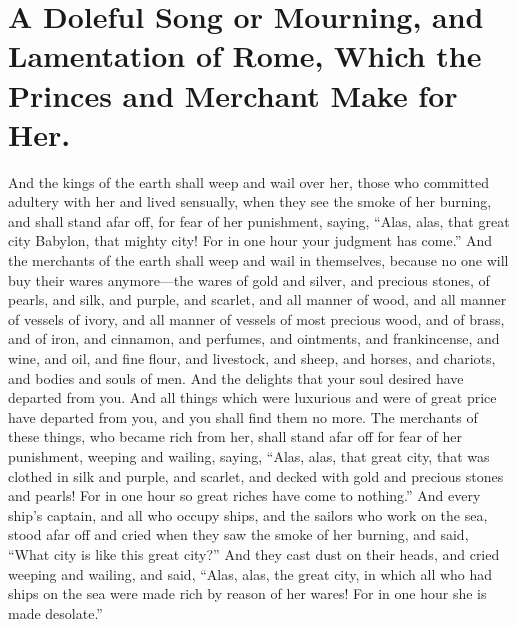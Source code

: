 \chapter[Sermon 79. A Doleful Song or Mourning, and Lamentation of Rome, Which the Princes and Merchant Make for Her.]{A Doleful Song or Mourning, and Lamentation of Rome, Which the Princes and Merchant Make for Her.}
\label{sermon:079}

And the kings of the earth shall weep and wail over her, those who committed adultery with her and lived sensually, when they see the smoke of her burning, and shall stand afar off, for fear of her punishment, saying, “Alas, alas, that great city Babylon, that mighty city! For in one hour your judgment has come.” And the merchants of the earth shall weep and wail in themselves, because no one will buy their wares anymore—the wares of gold and silver, and precious stones, of pearls, and silk, and purple, and scarlet, and all manner of wood, and all manner of vessels of ivory, and all manner of vessels of most precious wood, and of brass, and of iron, and cinnamon, and perfumes, and ointments, and frankincense, and wine, and oil, and fine flour, and livestock, and sheep, and horses, and chariots, and bodies and souls of men. And the delights that your soul desired have departed from you. And all things which were luxurious and were of great price have departed from you, and you shall find them no more. The merchants of these things, who became rich from her, shall stand afar off for fear of her punishment, weeping and wailing, saying, “Alas, alas, that great city, that was clothed in silk and purple, and scarlet, and decked with gold and precious stones and pearls! For in one hour so great riches have come to nothing.” And every ship’s captain, and all who occupy ships, and the sailors who work on the sea, stood afar off and cried when they saw the smoke of her burning, and said, “What city is like this great city?” And they cast dust on their heads, and cried weeping and wailing, and said, “Alas, alas, the great city, in which all who had ships on the sea were made rich by reason of her wares! For in one hour she is made desolate.”


